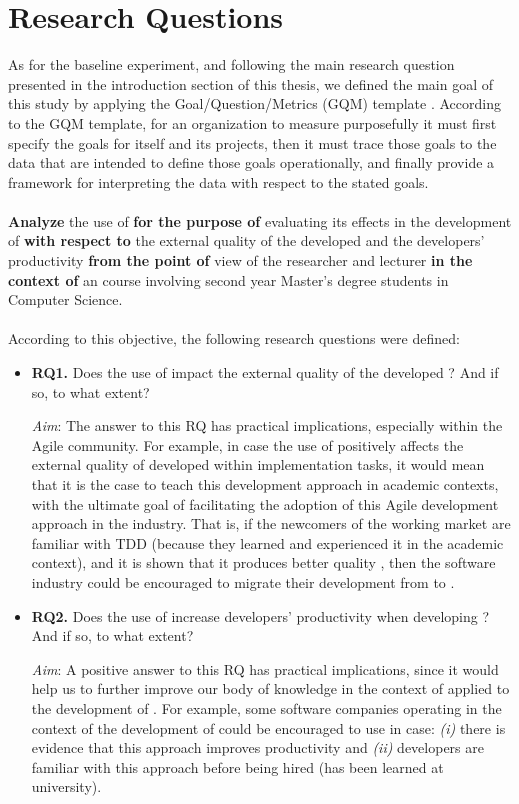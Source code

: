 \section{Research Questions}
As for the baseline experiment, and following the main research question presented in the introduction section of this thesis, we defined the main goal of this study by applying the Goal/Question/Metrics (GQM) template \cite{GQM}.
According to the GQM template, for an organization to measure purposefully it must first specify the goals for itself and its projects, then it must trace those goals to the data that are intended to define those goals operationally, and finally provide a framework for interpreting the data with respect to the stated goals.
\\ \ \\
\noindent
\textbf{Analyze} the use of \tdd 
\textbf{for the purpose of} evaluating its effects in the development of \ess
\textbf{with respect to} the external quality of the developed \ess and the developers' productivity 
\textbf{from the point of} view of the researcher and lecturer 
\textbf{in the context of} an \es course involving second year Master's degree students in Computer Science.
\\ \ \\

\noindent According to this objective, the following research questions were defined:
\begin{itemize}
    \item \textbf{RQ1.} Does the use of \tdd impact the external quality of the developed \ess? And if so, to what extent?

    \noindent\textit{Aim}: The answer to this RQ has practical implications, especially within the Agile community. For example, in case the use of \tdd positively affects the external quality of \ess developed within implementation tasks, it would mean that it is the case to teach this development approach in academic contexts, with the ultimate goal of facilitating the adoption of this Agile development approach in the industry. That is, if the newcomers of the working market are familiar with TDD (because they learned and experienced it in the academic context), and it is shown that it produces better quality \ess, then the software industry could be encouraged to migrate their development from \notdd to \tdd.

    \item \textbf{RQ2.} Does the use of \tdd increase developers' productivity when developing \ess? And if so, to what extent?

    \noindent\textit{Aim}: A positive answer to this RQ has practical implications, since it would help us to further improve our body of knowledge in the context of \tdd applied to the development of \ess. For example, some software companies operating in the context of the development of \ess could be encouraged to use \tdd in case: \textit{(i)} there is evidence that this approach
    improves productivity and \textit{(ii)} developers are familiar with this approach before being hired (\eg \tdd has been learned at university).
\end{itemize}




